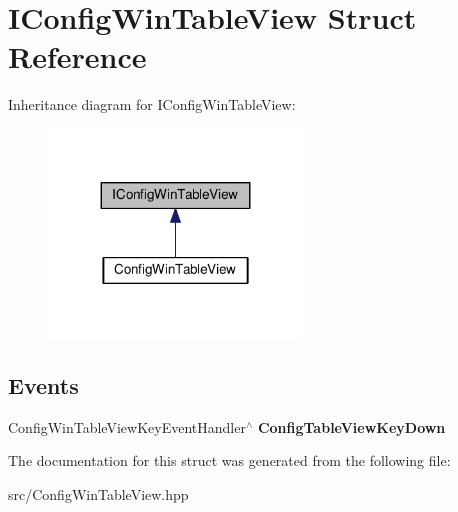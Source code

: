 \hypertarget{structIConfigWinTableView}{}\section{I\+Config\+Win\+Table\+View Struct Reference}
\label{structIConfigWinTableView}


Inheritance diagram for I\+Config\+Win\+Table\+View\+:
\nopagebreak
\begin{figure}[H]
\begin{center}
\leavevmode
\includegraphics[width=191pt]{structIConfigWinTableView__inherit__graph}
\end{center}
\end{figure}
\subsection*{Events}
\begin{DoxyCompactItemize}
\item 
\mbox{\label{structIConfigWinTableView_a876cbf8e536ccf34a7dda3b45b156362}} 
Config\+Win\+Table\+View\+Key\+Event\+Handler$^\wedge$ {\bfseries Config\+Table\+View\+Key\+Down}
\end{DoxyCompactItemize}


The documentation for this struct was generated from the following file\+:\begin{DoxyCompactItemize}
\item 
src/Config\+Win\+Table\+View.\+hpp\end{DoxyCompactItemize}
